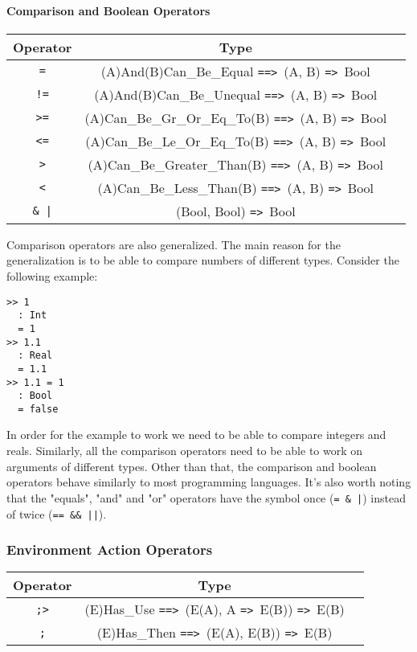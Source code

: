 \documentclass{article}
\def\ra{\texttt{=>}\ }
\def\Ra{\texttt{==>}\ }
\begin{document}
\paragraph{Comparison and Boolean Operators}

\begin{center}
\begin{tabular}{ |c|c|c| } 
\hline
Operator & Type \\ 
\hline
\hline
\texttt{=} & (A)And(B)Can_Be_Equal \Ra (A, B) \ra Bool \\
\hline
\texttt{!=} & (A)And(B)Can_Be_Unequal \Ra (A, B) \ra Bool \\
\hline
\texttt{>=} & (A)Can_Be_Gr_Or_Eq_To(B) \Ra (A, B) \ra Bool \\
\hline
\texttt{<=} & (A)Can_Be_Le_Or_Eq_To(B) \Ra (A, B) \ra Bool \\
\hline
\texttt{>} & (A)Can_Be_Greater_Than(B) \Ra (A, B) \ra Bool \\
\hline
\texttt{<} & (A)Can_Be_Less_Than(B) \Ra (A, B) \ra Bool \\
\hline
\texttt{\& |} & (Bool, Bool) \ra Bool \\
\hline
\end{tabular}
\end{center}
Comparison operators are also generalized. The main reason for the
generalization is to be able to compare numbers of different types. Consider
the following example:

\begin{verbatim}
>> 1
  : Int
  = 1
>> 1.1
  : Real
  = 1.1
>> 1.1 = 1
  : Bool
  = false
\end{verbatim}
In order for the example to work we need to be able to compare integers and
reals.  Similarly, all the comparison operators need to be able to work on
arguments of different types. Other than that, the comparison and boolean
operators behave similarly to most programming languages. It's also worth
noting that the "equals", "and" and "or" operators have the symbol once
(\texttt{= \& |}) instead of twice (\texttt{== \&\& ||}).

\subsubsection{Environment Action Operators}
\label{subsec:envacts}

\begin{center}
\begin{tabular}{ |c|c|c| } 
\hline
Operator & Type \\ 
\hline
\hline
\texttt{;>} & (E)Has_Use \Ra (E(A), A \ra E(B)) \ra E(B) \\
\hline
\texttt{;} & (E)Has_Then \Ra (E(A), E(B)) \ra E(B) \\
\hline
\end{tabular}
\end{center}
\end{document}
